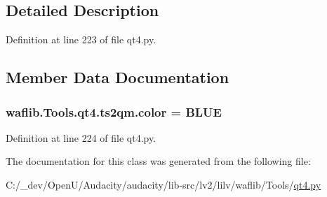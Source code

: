 \subsection{Detailed Description}


Definition at line 223 of file qt4.\+py.



\subsection{Member Data Documentation}
\subsubsection[{\texorpdfstring{color}{color}}]{ waflib.\+Tools.\+qt4.\+ts2qm.\+color = \textquotesingle{}B\+L\+UE\textquotesingle{}\hspace{0.3cm}{\ttfamily [static]}}\hypertarget{classwaflib_1_1_tools_1_1qt4_1_1ts2qm_ab1ca93ce9a16f3f2772617b9c0a30716}{}\label{classwaflib_1_1_tools_1_1qt4_1_1ts2qm_ab1ca93ce9a16f3f2772617b9c0a30716}


Definition at line 224 of file qt4.\+py.



The documentation for this class was generated from the following file\+:\begin{DoxyCompactItemize}
\item 
C\+:/\+\_\+dev/\+Open\+U/\+Audacity/audacity/lib-\/src/lv2/lilv/waflib/\+Tools/\hyperlink{lilv_2waflib_2_tools_2qt4_8py}{qt4.\+py}\end{DoxyCompactItemize}
